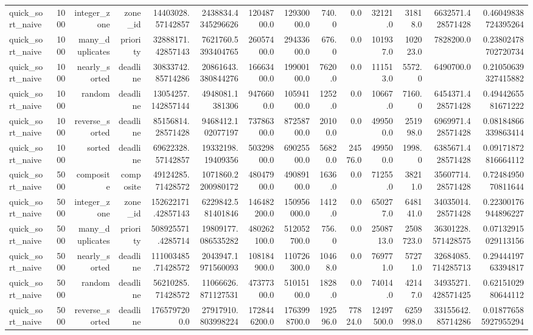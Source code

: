 \begin{table}[htbp]
\begin{tabular}{lrrrrrrrrrrrrr}
quick_sort_naive & 1000 & integer_zone & zone_id & 14403028.57142857 & 2438834.4345296626 & 12048700.0 & 12930000.0 & 740.0 & 0.0 & 32121.0 & 31818.0 & 6632571.428571428 & 0.46049838724395264 \\
quick_sort_naive & 1000 & many_duplicates & priority & 32888171.42857143 & 7621760.5393404765 & 26057400.0 & 29433600.0 & 676.0 & 0.0 & 101937.0 & 102023.0 & 7828200.0 & 0.23802478702720734 \\
quick_sort_naive & 1000 & nearly_sorted & deadline & 30833742.85714286 & 20861643.380844276 & 16663400.0 & 19900100.0 & 7620.0 & 0.0 & 111513.0 & 5572.0 & 6490700.0 & 0.21050639327415882 \\
quick_sort_naive & 1000 & random & deadline & 13054257.142857144 & 4948081.1381306 & 9476600.0 & 10594100.0 & 1252.0 & 0.0 & 10667.0 & 7160.0 & 6454371.428571428 & 0.4944265581671222 \\
quick_sort_naive & 1000 & reverse_sorted & deadline & 85156814.28571428 & 9468412.102077197 & 73786300.0 & 87258700.0 & 20100.0 & 0.0 & 499500.0 & 251998.0 & 6969971.428571428 & 0.08184866339863414 \\
quick_sort_naive & 1000 & sorted & deadline & 69622328.57142857 & 19332198.19409356 & 50329800.0 & 69025500.0 & 56820.0 & 24576.0 & 499500.0 & 1998.0 & 6385671.428571428 & 0.09171872816664112 \\
quick_sort_naive & 5000 & composite & composite & 49124285.71428572 & 1071860.2200980172 & 48047900.0 & 49089100.0 & 1636.0 & 0.0 & 71255.0 & 38211.0 & 35607714.28571428 & 0.7248495070811644 \\
quick_sort_naive & 5000 & integer_zone & zone_id & 152622171.42857143 & 6229842.581401846 & 146482200.0 & 150956000.0 & 1412.0 & 0.0 & 650277.0 & 648141.0 & 34035014.28571428 & 0.22300176944896227 \\
quick_sort_naive & 5000 & many_duplicates & priority & 508925571.4285714 & 19809177.086535282 & 480262100.0 & 512052700.0 & 756.0 & 0.0 & 2508713.0 & 2508723.0 & 36301228.571428575 & 0.07132915029113156 \\
quick_sort_naive & 5000 & nearly_sorted & deadline & 111003485.71428572 & 2043947.1971560093 & 108184900.0 & 110726300.0 & 10468.0 & 0.0 & 769771.0 & 57271.0 & 32684085.714285713 & 0.2944419763394817 \\
quick_sort_naive & 5000 & random & deadline & 56210285.71428572 & 11066626.871127531 & 47377300.0 & 51015100.0 & 1828.0 & 0.0 & 74014.0 & 42147.0 & 34935271.428571425 & 0.6215102980644112 \\
quick_sort_naive & 5000 & reverse_sorted & deadline & 1765797200.0 & 27917910.803998224 & 1728446200.0 & 1763998700.0 & 192596.0 & 77824.0 & 12497500.0 & 6259998.0 & 33155642.85714286 & 0.018776585927955294 \\

\end{tabular}
\end{table}

